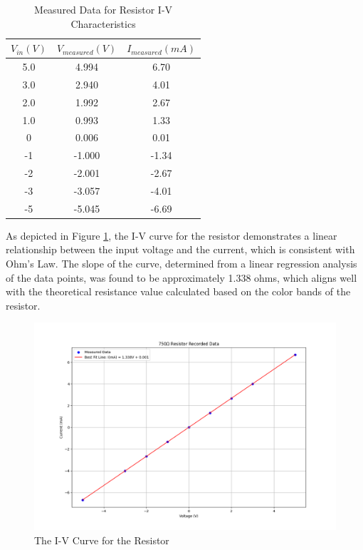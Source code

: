 \documentclass[12pt]{article}
\begin{document}
\begin{table}[H]
	\centering
	\begin{tabular}{|c|c|c|}
		\hline
		\textbf{\(V_{in} (V)\)} & \textbf{\(V_{measured} (V)\)} & \textbf{\(I_{measured} (mA)\)} \\
		\hline
		5.0                     & 4.994                         & 6.70                           \\
		3.0                     & 2.940                         & 4.01                           \\
		2.0                     & 1.992                         & 2.67                           \\
		1.0                     & 0.993                         & 1.33                           \\
		0                       & 0.006                         & 0.01                           \\
		-1                      & -1.000                        & -1.34                          \\
		-2                      & -2.001                        & -2.67                          \\
		-3                      & -3.057                        & -4.01                          \\
		-5                      & -5.045                        & -6.69                          \\
		\hline
	\end{tabular}
	\caption{Measured Data for Resistor I-V Characteristics}
	\label{tab:resistor_data}
\end{table}

As depicted in Figure \ref{fig:ex1}, the I-V curve for the resistor demonstrates a linear relationship between the input voltage and the current, which is consistent with Ohm's Law. The slope of the curve, determined from a linear regression analysis of the data points, was found to be approximately 1.338 ohms, which aligns well with the theoretical resistance value calculated based on the color bands of the resistor.
\begin{figure}[H]
	\center
	\includegraphics[width=13cm]{01_1}
	\caption{The I-V Curve for the Resistor}
	\label{fig:ex1}
\end{figure}
\end{document}
